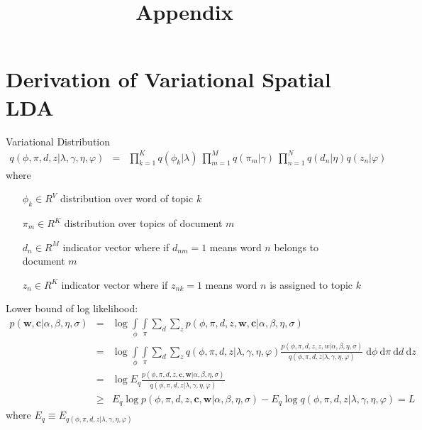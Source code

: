 \documentclass[]{article}
\title{Appendix}
\author{}
\begin{document}
\maketitle

\section*{Derivation of Variational Spatial LDA}

Variational Distribution
\begin{eqnarray}
q(\phi,\pi,d,z | \lambda,\gamma,\eta,\varphi) &=& \prod\limits_{k=1}^{K}q(\phi_k|\lambda) \: \prod\limits_{m=1}^{M}q(\pi_m|\gamma) \: \prod\limits_{n=1}^{N}q(d_n | \eta) q(z_n | \varphi)
\end{eqnarray}
where 
\begin{itemize}
	\item[$\phi_k \in R^V$] distribution over word of topic $k$
	\item[$\pi_m \in R^K$] distribution over topics of document $m$
	\item[$d_n \in R^M$] indicator vector where if $d_{nm} = 1$ means word $n$ belongs to document $m$
	\item[$z_n \in R^K$] indicator vector where if $z_{nk} = 1$ means word $n$ is assigned to topic $k$
\end{itemize}

Lower bound of log likelihood:
\begin{eqnarray}
p(\boldsymbol{w}, \boldsymbol{c} | \alpha,\beta,\eta,\sigma) 
&=& \log \int\limits_{\phi} \int\limits_{\pi} \sum\limits_{d} \sum\limits_{z} p(\phi,\pi,d,z,\boldsymbol{w},\boldsymbol{c} | \alpha,\beta,\eta,\sigma) \\
&=&  \log \int\limits_{\phi} \int\limits_{\pi} \sum\limits_{d} \sum\limits_{z} q(\phi,\pi,d,z | \lambda,\gamma,\eta,\varphi) \frac{p(\phi,\pi,d,z,z,w | \alpha,\beta,\eta,\sigma)}{q(\phi,\pi,d,z | \lambda,\gamma,\eta,\varphi)} \; \mathrm{d}\phi \: \mathrm{d}\pi \: \mathrm{d}d \: \mathrm{d}z\\
&=& \log E_q \frac{p(\phi,\pi,d,z,\boldsymbol{c},\boldsymbol{w} | \alpha,\beta,\eta,\sigma)}{q(\phi,\pi,d,z | \lambda,\gamma,\eta,\varphi)} \\
&\ge& E_q \log p(\phi,\pi,d,z,\boldsymbol{c},\boldsymbol{w} | \alpha,\beta,\eta,\sigma) - E_q \log q(\phi,\pi,d,z | \lambda,\gamma,\eta,\varphi) = L
\end{eqnarray}
where $E_q \equiv E_{q(\phi,\pi,d,z | \lambda,\gamma,\eta,\varphi)}$
\end{document}
